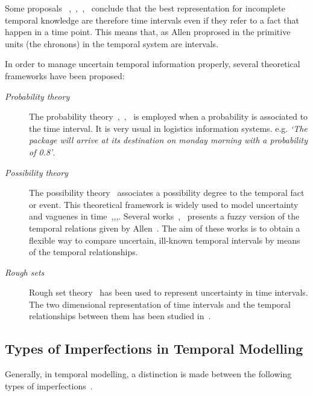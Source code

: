 Some proposals ~\cite{knight1993},~\cite{Cru97},~\cite{nagypal2003},~\cite{Chountas2000} conclude that the best representation for incomplete temporal knowledge are therefore time intervals even if they refer to a fact that happen in a time point. This means that, as Allen proprosed in \cite{Allen83} the primitive units (the chronons) in the temporal system are intervals.

In order to manage uncertain temporal information properly, several theoretical frameworks have been proposed:

\begin{description}
\item[\emph{Probability theory}]
The probability theory~\cite{Dey1996},~\cite{Lakshmanan1997},~\cite{Haddawy1996} is employed when a probability is associated to the time interval. It is very usual in logistics information systems. e.g. \emph{`The package will arrive at its destination on monday morning with a probability of 0.8'}.



\item[\emph{Possibility theory}]
The possibility theory~\cite{Zadeh65} associates a possibility degree to the temporal fact or event. This theoretical framework is widely used to model uncertainty and vaguenes in time~\cite{Dubois:jucs_9_9:fuzziness_and_uncertainty_in},\cite{Dubois89},\cite{devos94},\cite{nagypal2003}. Several works~\cite{schockaert08},~\cite{ohlbach2004} presents a fuzzy version of the temporal relations given by Allen~\cite{Allen83}. The aim of these works is to obtain a flexible way to compare uncertain, ill-known temporal intervals by means of the temporal relationships.


\item[\emph{Rough sets}]
Rough set theory~\cite{Pawlak1995} has been used to represent uncertainty in time intervals. The two dimensional representation of time intervals and the temporal relationships between them has been studied in~\cite{Qia09}.
\end{description}




\subsection{Types of Imperfections in Temporal Modelling}
Generally, in temporal modelling, a distinction is made between the following types of imperfections~\cite{nagypal2003}.


